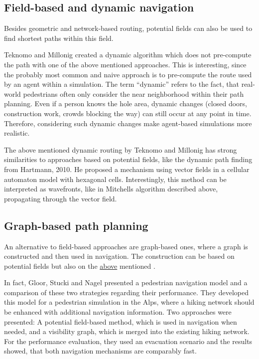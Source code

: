 	\subsection{Field-based and dynamic navigation}
	
		Besides geometric and network-based routing, potential fields can also be used to find shortest paths within this field.
		
		Teknomo and Millonig created a dynamic algorithm which does not pre-compute the path with one of the above mentioned approaches\cite{teknomo-millonig-routing}.
		This is interesting, since the probably most common and naive approach is to pre-compute the route used by an agent within a simulation.
		The term \enquote{dynamic} refers to the fact, that real-world pedestrians often only consider the near neighborhood within their path planning.
		Even if a person knows the hole area, dynamic changes (closed doors, construction work, crowds blocking the way) can still occur at any point in time.
		Therefore, considering such dynamic changes make agent-based simulations more realistic.
		
		The above mentioned dynamic routing by Teknomo and Millonig has strong similarities to approaches based on potential fields, like the dynamic path finding from Hartmann, 2010\cite{hartmann-geodesic}.
		He proposed a mechanism using vector fields in a cellular automaton model with hexagonal cells.
		Interestingly, this method can be interpreted as wavefronts, like in Mitchells algorithm described above, propagating through the vector field.
			
	\subsection{Graph-based path planning}
	
		An alternative to field-based approaches are graph-based ones, where a graph is constructed and then used in navigation.
		The construction can be based on potential fields but also on the \hyperref[subsec:related-work:visibility-graph]{above} mentioned .
		
		In fact, Gloor, Stucki and Nagel presented a pedestrian navigation model and a comparison of these two strategies regarding their performance\cite{gloor-hybrid-pedestrian-routing}.
		They developed this model for a pedestrian simulation in the Alps, where a hiking network should be enhanced with additional navigation information.
		Two approaches were presented: A potential field-based method, which is used in navigation when needed, and a visibility graph, which is merged into the existing hiking network.
		For the performance evaluation, they used an evacuation scenario and the results showed, that both navigation mechanisms are comparably fast.
		
